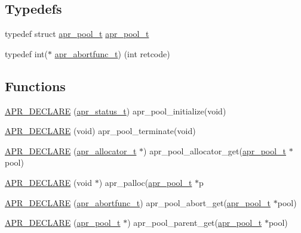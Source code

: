 \subsection*{Typedefs}
\begin{DoxyCompactItemize}
\item 
typedef struct \mbox{\hyperlink{group__apr__pools_gaf137f28edcf9a086cd6bc36c20d7cdfb}{apr\+\_\+pool\+\_\+t}} \mbox{\hyperlink{group__apr__pools_gaf137f28edcf9a086cd6bc36c20d7cdfb}{apr\+\_\+pool\+\_\+t}}
\item 
typedef int($\ast$ \mbox{\hyperlink{group__apr__pools_ga370a939349adf6d1438068e2fc69a0dd}{apr\+\_\+abortfunc\+\_\+t}}) (int retcode)
\end{DoxyCompactItemize}
\subsection*{Functions}
\begin{DoxyCompactItemize}
\item 
\mbox{\hyperlink{group__apr__pools_ga95a4b4050d59535eea61951c649d49e6}{A\+P\+R\+\_\+\+D\+E\+C\+L\+A\+RE}} (\mbox{\hyperlink{group__apr__errno_gaf76ee4543247e9fb3f3546203e590a6c}{apr\+\_\+status\+\_\+t}}) apr\+\_\+pool\+\_\+initialize(void)
\item 
\mbox{\hyperlink{group__apr__pools_gac01d61b42e8b6e65b0da64d18ce146ac}{A\+P\+R\+\_\+\+D\+E\+C\+L\+A\+RE}} (void) apr\+\_\+pool\+\_\+terminate(void)
\item 
\mbox{\hyperlink{group__apr__pools_ga0db3e36b392c39302ec1012e821d20ea}{A\+P\+R\+\_\+\+D\+E\+C\+L\+A\+RE}} (\mbox{\hyperlink{group__apr__allocator_ga1ceabfd30fcfc455e47d052d2a24244b}{apr\+\_\+allocator\+\_\+t}} $\ast$) apr\+\_\+pool\+\_\+allocator\+\_\+get(\mbox{\hyperlink{group__apr__pools_gaf137f28edcf9a086cd6bc36c20d7cdfb}{apr\+\_\+pool\+\_\+t}} $\ast$pool)
\item 
\mbox{\hyperlink{group__apr__pools_ga7cb63e2c63fd7769ce05b8bd5d82b833}{A\+P\+R\+\_\+\+D\+E\+C\+L\+A\+RE}} (void $\ast$) apr\+\_\+palloc(\mbox{\hyperlink{group__apr__pools_gaf137f28edcf9a086cd6bc36c20d7cdfb}{apr\+\_\+pool\+\_\+t}} $\ast$p
\item 
\mbox{\hyperlink{group__apr__pools_ga5f3a919f1753c62a727235bc397d8ae3}{A\+P\+R\+\_\+\+D\+E\+C\+L\+A\+RE}} (\mbox{\hyperlink{group__apr__pools_ga370a939349adf6d1438068e2fc69a0dd}{apr\+\_\+abortfunc\+\_\+t}}) apr\+\_\+pool\+\_\+abort\+\_\+get(\mbox{\hyperlink{group__apr__pools_gaf137f28edcf9a086cd6bc36c20d7cdfb}{apr\+\_\+pool\+\_\+t}} $\ast$pool)
\item 
\mbox{\hyperlink{group__apr__pools_ga514eba9e7f17bad2eb7a034c5b65352e}{A\+P\+R\+\_\+\+D\+E\+C\+L\+A\+RE}} (\mbox{\hyperlink{group__apr__pools_gaf137f28edcf9a086cd6bc36c20d7cdfb}{apr\+\_\+pool\+\_\+t}} $\ast$) apr\+\_\+pool\+\_\+parent\+\_\+get(\mbox{\hyperlink{group__apr__pools_gaf137f28edcf9a086cd6bc36c20d7cdfb}{apr\+\_\+pool\+\_\+t}} $\ast$pool)
\end{DoxyCompactItemize}
